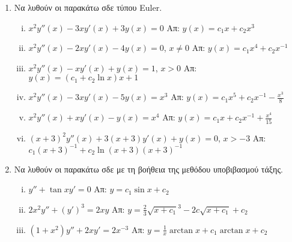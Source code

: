 



\thispagestyle{empty}



\begin{center}
\end{center}

\vspace{\baselineskip}

\begin{enumerate}
    \item Να λυθούν οι παρακάτω σδε τύπου Euler.
        \begin{enumerate}[i)]
            \setlength\itemsep{15pt}
        \item $ x^{2}y''(x)-3xy'(x)+3y(x)=0 $ 
            \hfill Απ: $ y(x)=c_{1}x + c_{2}x^{3} $
        \item $ x^{2}y''(x)-2xy'(x)-4y(x)=0 $,\; $ x \neq 0 $ 
            \hfill Απ: $ y(x)=c_{1}x^{4}+ c_{2} x^{-1} $ 
        \item $ x^{2}y''(x)-xy'(x)+y(x)=1 $,\; $ x>0 $ 
            \hfill Απ: $ y(x)=(c_{1}+c_{2} \ln{x})x + 1 $  
        \item $ x^{2}y''(x)-3xy'(x)-5y(x)=x^{3} $ 
            \hfill Απ: $ y(x)=c_{1}x^{5}+ c_{2} x^{-1}- \frac{x^{3}}{8} $ 
        \item $ x^{2}y''(x)+xy'(x)-y(x)=x^{4} $ 
            \hfill Απ: $ y(x)=c_{1}x+c_{2}x^{-1}+ \frac{x^{4}}{15} $ 
        \item \label{eul} $ (x+3)^{2}y''(x)+3(x+3)y'(x)+y(x)=0 $,\; $ x>-3 $ 
            \hfill Απ: $\scriptstyle{ c_{1} (x+3)^{-1} + c_{2}\ln(x+3)(x+3)^{-1}} $
        \end{enumerate}

    \item Να λυθούν οι παρακάτω σδε με τη βοήθεια της μεθόδου υποβιβασμού τάξης.
        \begin{enumerate}[i)]
            \setlength\itemsep{15pt}
        \item $ y'' + \tan{x} y' = 0 $ \hfill Απ: $ y= c_{1} \sin{x} + c_{2} $ 
        \item $ 2x^{2}y''+ (y')^{3} = 2xy $ 
            \hfill Απ: $ y= \frac{2}{3} \sqrt{x+c_{1}}^{3} - 
            2c \sqrt{x+c_{1}} + c_{2} $ 
        \item $ (1+x^{2})y'' + 2xy' = 2x^{-3} $ \hfill Απ: $ y= \frac{1}{x} 
            \arctan x + c_{1} \arctan x + c_{2} $ 
        \end{enumerate}
\end{enumerate}


